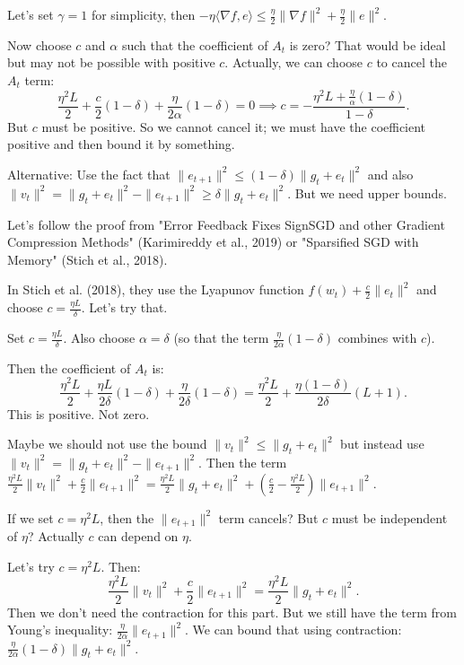 \documentclass{article}
\begin{document}
Let's set $\gamma = 1$ for simplicity, then $-\eta \langle \nabla f, e \rangle \le \frac{\eta}{2} \|\nabla f\|^2 + \frac{\eta}{2} \|e\|^2$.

Now choose $c$ and $\alpha$ such that the coefficient of $A_t$ is zero? That would be ideal but may not be possible with positive $c$. Actually, we can choose $c$ to cancel the $A_t$ term:
\[
\frac{\eta^2 L}{2} + \frac{c}{2}(1-\delta) + \frac{\eta}{2\alpha}(1-\delta) = 0 \implies c = -\frac{\eta^2 L + \frac{\eta}{\alpha}(1-\delta)}{1-\delta}.
\]
But $c$ must be positive. So we cannot cancel it; we must have the coefficient positive and then bound it by something.

Alternative: Use the fact that $\|e_{t+1}\|^2 \le (1-\delta)\|g_t+e_t\|^2$ and also $\|v_t\|^2 = \|g_t+e_t\|^2 - \|e_{t+1}\|^2 \ge \delta \|g_t+e_t\|^2$. But we need upper bounds.

Let's follow the proof from "Error Feedback Fixes SignSGD and other Gradient Compression Methods" (Karimireddy et al., 2019) or "Sparsified SGD with Memory" (Stich et al., 2018).

In Stich et al. (2018), they use the Lyapunov function $f(w_t) + \frac{c}{2}\|e_t\|^2$ and choose $c = \frac{\eta L}{\delta}$. Let's try that.

Set $c = \frac{\eta L}{\delta}$. Also choose $\alpha = \delta$ (so that the term $\frac{\eta}{2\alpha}(1-\delta)$ combines with $c$).

Then the coefficient of $A_t$ is:
\[
\frac{\eta^2 L}{2} + \frac{\eta L}{2\delta}(1-\delta) + \frac{\eta}{2\delta}(1-\delta) = \frac{\eta^2 L}{2} + \frac{\eta(1-\delta)}{2\delta}(L + 1).
\]
This is positive. Not zero.

Maybe we should not use the bound $\|v_t\|^2 \le \|g_t+e_t\|^2$ but instead use $\|v_t\|^2 = \|g_t+e_t\|^2 - \|e_{t+1}\|^2$. Then the term $\frac{\eta^2 L}{2}\|v_t\|^2 + \frac{c}{2}\|e_{t+1}\|^2 = \frac{\eta^2 L}{2}\|g_t+e_t\|^2 + (\frac{c}{2} - \frac{\eta^2 L}{2})\|e_{t+1}\|^2$.

If we set $c = \eta^2 L$, then the $\|e_{t+1}\|^2$ term cancels? But $c$ must be independent of $\eta$? Actually $c$ can depend on $\eta$.

Let's try $c = \eta^2 L$. Then:
\[
\frac{\eta^2 L}{2}\|v_t\|^2 + \frac{c}{2}\|e_{t+1}\|^2 = \frac{\eta^2 L}{2}\|g_t+e_t\|^2.
\]
Then we don't need the contraction for this part. But we still have the term from Young's inequality: $\frac{\eta}{2\alpha}\|e_{t+1}\|^2$. We can bound that using contraction: $\frac{\eta}{2\alpha}(1-\delta)\|g_t+e_t\|^2$.
\end{document}
